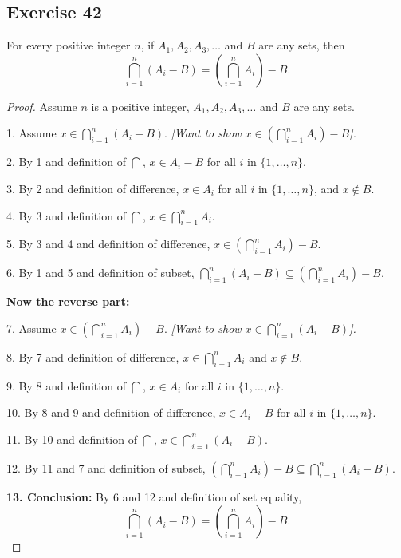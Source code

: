 \documentclass[14pt]{extarticle}
\newcommand{\dps}{\displaystyle}
\begin{document}
\subsection{Exercise 42}
For every positive integer $n$, if \(A_1, A_2, A_3, \ldots\) and $B$ are any sets, then
\[
  \bigcap_{i=1}^n (A_i - B) = \left(\bigcap_{i=1}^n A_i\right) - B.
\]
\begin{proof}
  Assume $n$ is a positive integer, \(A_1, A_2, A_3, \ldots\) and $B$ are any sets.

  1. Assume \(\dps x \in \bigcap_{i=1}^n (A_i - B)\). {\it [Want to show \(\dps x \in \left(\bigcap_{i=1}^n A_i\right) - B\)].}

  2. By 1 and definition of \(\dps \bigcap\), \(x \in A_i - B\) for all $i$ in \(\{1, \ldots, n\}\).

  3. By 2 and definition of difference, \(x \in A_i\) for all $i$ in \(\{1, \ldots, n\}\), and \(x \notin B\).

  4. By 3 and definition of $\dps \bigcap$, \(\dps x \in \bigcap_{i=1}^n A_i\).

  5. By 3 and 4 and definition of difference, \(\dps x \in \left(\bigcap_{i=1}^n A_i\right) - B\).

  6. By 1 and 5 and definition of subset, \(\dps \bigcap_ {i=1}^n (A_i - B) \subseteq \left(\bigcap_{i=1}^n A_i\right) - B.\)

  {\bf Now the reverse part:}

  7. Assume \(\dps x \in \left(\bigcap_{i=1}^n A_i\right) - B\). {\it [Want to show \(\dps x \in \bigcap_{i=1}^n (A_i - B)\)].}

  8. By 7 and definition of difference, \(\dps x \in \bigcap_{i=1}^n A_i\) and \(x \notin B\).

  9. By 8 and definition of $\dps \bigcap$, \(x \in A_i\) for all $i$ in \(\{1, \ldots, n\}\).

  10. By 8 and 9 and definition of difference, \(x \in A_i - B\) for all $i$ in \(\{1, \ldots, n\}\).

  11. By 10 and definition of $\dps \bigcap$, \(x \in \dps \bigcap_{i=1}^n (A_i - B)\).

  12. By 11 and 7 and definition of subset, \(\dps \left( \bigcap_{i=1}^n A_i\right) - B \subseteq \bigcap_{i=1}^n (A_i - B)\).

    {\bf 13. Conclusion:} By 6 and 12 and definition of set equality,
  \[
    \bigcap_{i=1}^n (A_i - B) = \left(\bigcap_{i=1}^n A_i\right) - B.
  \]
\end{proof}
\end{document}
